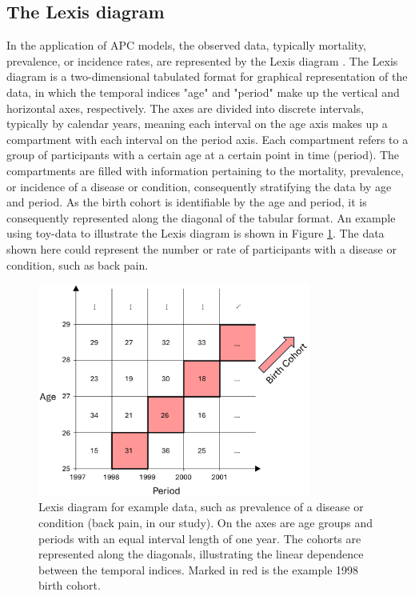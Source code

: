 \subsection{The Lexis diagram}
\label{section:lexis}
In the application of APC models, the observed data, typically mortality, prevalence, or incidence rates, are represented by the Lexis diagram \citep{Lexis,Lexis2}. The Lexis diagram is a two-dimensional tabulated format for graphical representation of the data, in which the temporal indices "age" and "period" make up the vertical and horizontal axes, respectively. The axes are divided into discrete intervals, typically by calendar years, meaning each interval on the age axis makes up a compartment with each interval on the period axis. Each compartment refers to a group of participants with a certain age at a certain point in time (period). The compartments are filled with information pertaining to the mortality, prevalence, or incidence of a disease or condition, consequently stratifying the data by age and period. As the birth cohort is identifiable by the age and period, it is consequently represented along the diagonal of the tabular format. An example using toy-data to illustrate the Lexis diagram is shown in Figure \ref{figure:Lexis}. The data shown here could represent the number or rate of participants with a disease or condition, such as back pain.

\begin{figure}[!ht]
    \centering
    \includegraphics[width = 0.8\textwidth]{./Figures/Lexis.pdf}
    \vspace{-0.2cm}
    \caption{Lexis diagram for example data, such as prevalence of a disease or condition (back pain, in our study). On the axes are age groups and periods with an equal interval length of one year. The cohorts are represented along the diagonals, illustrating the linear dependence between the temporal indices. Marked in red is the example 1998 birth cohort.}
    \label{figure:Lexis}
\end{figure}

